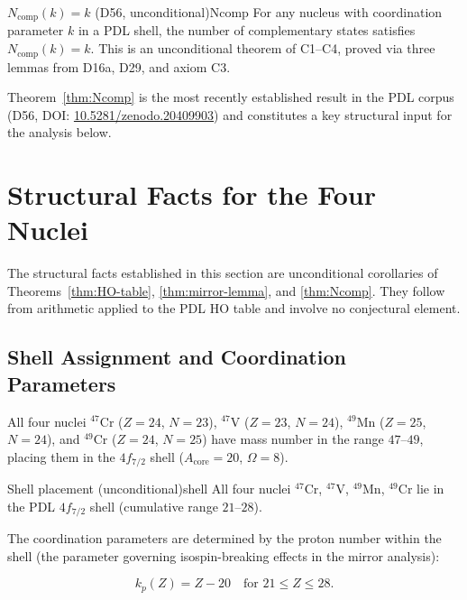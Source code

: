 \documentclass[12pt,a4paper]{article}
\theoremstyle{remark}
\begin{document}
\begin{pdltheorem}{$N_{\text{comp}}(k) = k$ (D56, unconditional)}{Ncomp}
For any nucleus with coordination parameter $k$ in a PDL shell, the number of complementary states satisfies $N_{\text{comp}}(k) = k$. This is an unconditional theorem of C1--C4, proved via three lemmas from D16a, D29, and axiom C3.
\end{pdltheorem}

Theorem~\ref{thm:Ncomp} is the most recently established result in the PDL corpus (D56, DOI: \href{https://doi.org/10.5281/zenodo.20409903}{10.5281/zenodo.20409903}) and constitutes a key structural input for the analysis below.

\section{Structural Facts for the Four Nuclei}
\label{sec:structural}

The structural facts established in this section are unconditional corollaries of Theorems~\ref{thm:HO-table}, \ref{thm:mirror-lemma}, and \ref{thm:Ncomp}. They follow from arithmetic applied to the PDL HO table and involve no conjectural element.

\subsection{Shell Assignment and Coordination Parameters}
\label{ssec:shell}

All four nuclei $^{47}$Cr ($Z=24$, $N=23$), $^{47}$V ($Z=23$, $N=24$), $^{49}$Mn ($Z=25$, $N=24$), and $^{49}$Cr ($Z=24$, $N=25$) have mass number in the range $47$--$49$, placing them in the $4f_{7/2}$ shell ($A_{\text{core}} = 20$, $\Omega = 8$).

\begin{pdlcorollary}{Shell placement (unconditional)}{shell}
All four nuclei $^{47}$Cr, $^{47}$V, $^{49}$Mn, $^{49}$Cr lie in the PDL $4f_{7/2}$ shell (cumulative range $21$--$28$).
\end{pdlcorollary}

The coordination parameters are determined by the proton number within the shell (the parameter governing isospin-breaking effects in the mirror analysis):

\begin{equation}
k_p(Z) = Z - 20 \quad \text{for } 21 \le Z \le 28.
\end{equation}
\end{document}
